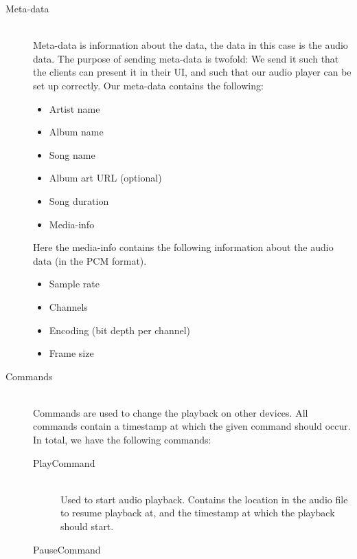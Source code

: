 \begin{description}
    \item[Meta-data] \hfill \\
        Meta-data is information about the data, the data in this case is the audio data.
        The purpose of sending meta-data is twofold: We send it such that the clients can present it in their UI, and such that our audio player can be set up correctly.
        Our meta-data contains the following:
        \begin{multicols}{2}
        \begin{itemize}
            \item Artist name
            \item Album name
            \item Song name
            \item Album art URL (optional)
            \item Song duration
            \item Media-info
        \end{itemize}
        \end{multicols}
        Here the media-info contains the following information about the audio data (in the \ac{PCM} format).
        \begin{multicols}{2}
        \begin{itemize}
            \item Sample rate
            \item Channels
            \item Encoding (bit depth per channel)
            \item Frame size
        \end{itemize}
    \end{multicols}
    \item[Commands] \hfill \\
        Commands are used to change the playback on other devices.
        All commands contain a timestamp at which the given command should occur.
        In total, we have the following commands:
        \begin{description}
            \item[PlayCommand] \hfill\\
                Used to start audio playback.
                Contains the location in the audio file to resume playback at, and the timestamp at which the playback should start.
            \item[PauseCommand] \hfill\\

\end{description}
\end{description}
